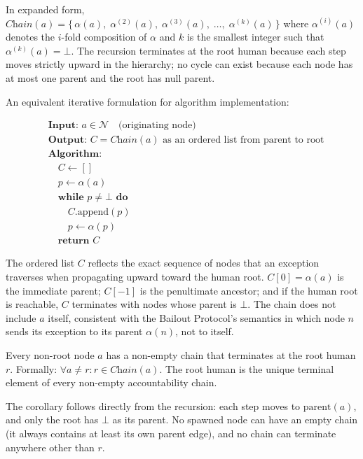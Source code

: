 In expanded form, $\textit{Chain}(a) = \{\,\alpha(a),\; \alpha^{(2)}(a),\; \alpha^{(3)}(a),\; \dots,\; \alpha^{(k)}(a)\,\}$ where $\alpha^{(i)}(a)$ denotes the $i$-fold composition of $\alpha$ and $k$ is the smallest integer such that $\alpha^{(k)}(a) = \bot$. The recursion terminates at the root human because each step moves strictly upward in the hierarchy; no cycle can exist because each node has at most one parent and the root has null parent.

An equivalent iterative formulation for algorithm implementation:

\begin{align}
& \textbf{Input: } a \in \mathcal{N} \quad \text{(originating node)} \tag{C-ITER} \\
& \textbf{Output: } C = \textit{Chain}(a) \text{ as an ordered list from parent to root} \\
& \textbf{Algorithm:} \\
& \quad C \leftarrow [] \\
& \quad p \leftarrow \alpha(a) \\
& \quad \textbf{while } p \neq \bot \textbf{ do} \\
& \qquad C.\text{append}(p) \\
& \qquad p \leftarrow \alpha(p) \\
& \quad \textbf{return } C
\end{align}

The ordered list $C$ reflects the exact sequence of nodes that an exception traverses when propagating upward toward the human root. $C[0] = \alpha(a)$ is the immediate parent; $C[-1]$ is the penultimate ancestor; and if the human root is reachable, $C$ terminates with nodes whose parent is $\bot$. The chain does not include $a$ itself, consistent with the Bailout Protocol's semantics in which node $n$ sends its exception to its parent $\alpha(n)$, not to itself.

\begin{corrollary}
Every non-root node $a$ has a non-empty chain that terminates at the root human $r$. Formally: $\forall a \neq r: r \in \textit{Chain}(a)$. The root human is the unique terminal element of every non-empty accountability chain.
\end{corrollary}

The corollary follows directly from the recursion: each step moves to $\text{parent}(a)$, and only the root has $\bot$ as its parent. No spawned node can have an empty chain (it always contains at least its own parent edge), and no chain can terminate anywhere other than $r$.

